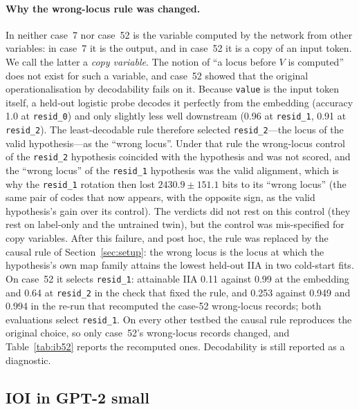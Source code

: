 \documentclass[11pt,a4paper]{article}
\begin{document}
\paragraph{Why the wrong-locus rule was changed.} In neither case~7 nor case~52 is the variable computed by the network from other variables: in case~7 it is the output, and in case~52 it is a copy of an input token. We call the latter a \emph{copy variable}. The notion of ``a locus before $V$ is computed'' does not exist for such a variable, and case~52 showed that the original operationalisation by decodability fails on it. Because \texttt{value} is the input token itself, a held-out logistic probe decodes it perfectly from the embedding (accuracy 1.0 at \texttt{resid\_0}) and only slightly less well downstream (0.96 at \texttt{resid\_1}, 0.91 at \texttt{resid\_2}). The least-decodable rule therefore selected \texttt{resid\_2}---the locus of the valid hypothesis---as the ``wrong locus''. Under that rule the wrong-locus control of the \texttt{resid\_2} hypothesis coincided with the hypothesis and was not scored, and the ``wrong locus'' of the \texttt{resid\_1} hypothesis was the valid alignment, which is why the \texttt{resid\_1} rotation then lost $2430.9\pm151.1$ bits to its ``wrong locus'' (the same pair of codes that now appears, with the opposite sign, as the valid hypothesis's gain over its control). The verdicts did not rest on this control (they rest on label-only and the untrained twin), but the control was mis-specified for copy variables. After this failure, and post hoc, the rule was replaced by the causal rule of Section~\ref{sec:setup}: the wrong locus is the locus at which the hypothesis's own map family attains the lowest held-out IIA in two cold-start fits. On case~52 it selects \texttt{resid\_1}: attainable IIA 0.11 against 0.99 at the embedding and 0.64 at \texttt{resid\_2} in the check that fixed the rule, and 0.253 against 0.949 and 0.994 in the re-run that recomputed the case-52 wrong-locus records; both evaluations select \texttt{resid\_1}. On every other testbed the causal rule reproduces the original choice, so only case~52's wrong-locus records changed, and Table~\ref{tab:ib52} reports the recomputed ones. Decodability is still reported as a diagnostic.

\subsection{IOI in GPT-2 small}
\label{sec:res:ioi}
\end{document}

